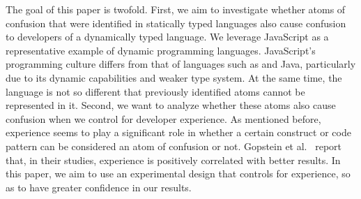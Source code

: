 The goal of this paper is twofold. First, we aim to investigate whether atoms of confusion that were identified in statically typed languages also cause confusion to developers of a dynamically typed language. We leverage JavaScript as a representative example of dynamic programming languages. 
JavaScript's programming culture differs from that of languages such as \clang and Java, particularly due to its dynamic capabilities and weaker type system. At the same time, the language is not so different that previously identified atoms cannot be represented in it. 
Second, we want to analyze whether these atoms also cause confusion when we control for developer experience. As mentioned before, experience seems to play a significant role in whether a certain construct or code pattern can be considered an atom of confusion or not. Gopstein et al.~\cite{DBLP:conf/sigsoft/GopsteinIYDZYC17} report that, in their studies, experience is positively correlated with better results. In this paper, we aim to use an experimental design that controls for experience, so as to have greater confidence in our results. 



